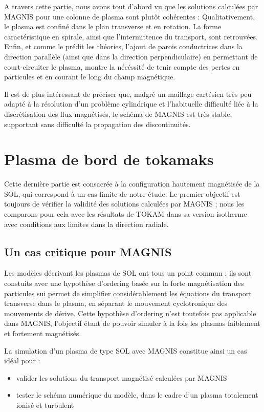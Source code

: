 \begin{refsection}
A travers cette partie, nous avons tout d'abord vu que 
les solutions calculées par MAGNIS pour une colonne de plasma
sont plutôt cohérentes : Qualitativement, le plasma est confiné dans le plan
transverse et en rotation. La forme caractéristique en spirale, ainsi que
l'intermittence du transport, sont retrouvées. Enfin, et comme le prédit les
théories, l'ajout de parois conductrices dans la direction parallèle (ainsi
que dans la direction perpendiculaire) en permettant de court-circuiter le
plasma, montre la nécéssité de tenir compte des pertes en particules et en
courant le long du champ magnétique.

Il est de plus intéressant de préciser que, malgré un maillage cartésien très
peu adapté à la résolution d'un problème cylindrique et l'habituelle difficulté
liée à la discrétisation des flux magnétisés, le schéma de MAGNIS est très
stable, supportant sans difficulté la propagation des discontinuités.

\section{Plasma de bord de tokamaks}

Cette dernière partie est consacrée à la configuration hautement magnétisée
de la SOL, qui correspond à un cas limite de notre étude. Le premier objectif
est toujours de vérifier la validité des solutions calculées par MAGNIS ; 
nous les comparons pour cela avec les résultats de
TOKAM dans sa version isotherme avec conditions aux limites dans la direction
radiale.

\subsection{Un cas critique pour MAGNIS}
Les modèles décrivant les plasmas de SOL ont tous un
point commun :
ils sont constuits avec une hypothèse d'ordering basée sur la forte magnétisation des
particules sui permet de simplifier considérablement les équations
du transport transverse dans le plasma, en séparant le mouvement cyclotronique
des mouvements de dérive.
Cette hypothèse d'ordering n'est
toutefois pas applicable dans MAGNIS, l'objectif étant de pouvoir simuler à la
fois les plasmas faiblement et fortement magnétisés. 

La simulation d'un plasma de type SOL avec MAGNIS constitue ainsi un cas idéal
pour :
\begin{itemize}
  \item valider les solutions du transport magnétisé calculées par MAGNIS
  \item	tester le schéma numérique du modèle, dans le cadre d'un plasma
  totalement ionisé et turbulent
 \end{itemize} 


\end{refsection}
